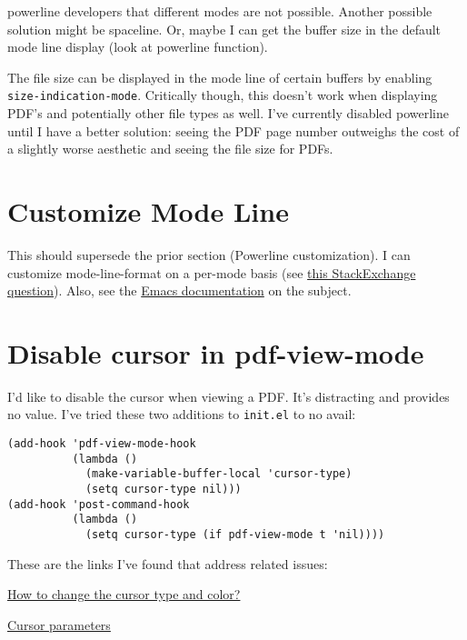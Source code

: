 \documentclass{default}
\begin{document}
powerline developers that different modes are not possible. Another possible solution might be
spaceline. Or, maybe I can get the buffer size in the default mode line display (look at powerline
function).

The file size can be displayed in the mode line of certain buffers by enabling
\texttt{size-indication-mode}. Critically though, this doesn't work when displaying PDF's
and potentially other file types as well. I've currently disabled powerline until I have a better
solution: seeing the PDF page number outweighs the cost of a slightly worse aesthetic and seeing the
file size for PDFs.

\section{Customize Mode Line}
\label{sec:customize-mode-line}

This should supersede the prior section (Powerline customization). I can customize mode-line-format
on a per-mode basis (see
\href{https://emacs.stackexchange.com/questions/13652/how-to-customize-mode-line-format}{this
  StackExchange question}). Also, see the
\href{https://www.gnu.org/software/emacs/manual/html_node/elisp/Mode-Line-Variables.html#Mode-Line-Variables}{Emacs
documentation} on the subject.

\section{Disable cursor in pdf-view-mode}

I'd like to disable the cursor when viewing a PDF. It's distracting and provides no value. I've
tried these two additions to \texttt{init.el} to no avail:

\begin{verbatim}
(add-hook 'pdf-view-mode-hook
          (lambda ()
            (make-variable-buffer-local 'cursor-type)
            (setq cursor-type nil)))
(add-hook 'post-command-hook
          (lambda ()
            (setq cursor-type (if pdf-view-mode t 'nil))))
\end{verbatim}

These are the links I've found that address related issues:

\href{https://emacs.stackexchange.com/questions/392/how-to-change-the-cursor-type-and-color}{How to
  change the cursor type and color?}

\href{https://www.gnu.org/software/emacs/manual/html_node/elisp/Cursor-Parameters.html}{Cursor
  parameters}
\end{document}
